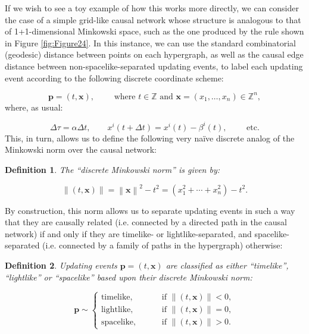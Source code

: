 \documentclass{article}
\newtheorem{definition}{Definition}
\begin{document}
If we wish to see a toy example of how this works more directly, we can consider the case of a simple grid-like causal network whose structure is analogous to that of 1+1-dimensional Minkowski space, such as the one produced by the rule shown in Figure \ref{fig:Figure24}. In this instance, we can use the standard combinatorial (geodesic) distance between points on each hypergraph, as well as the causal edge distance between non-spacelike-separated updating events, to label each updating event according to the following discrete coordinate scheme:

\begin{equation}
\mathbf{p} = \left( t, \mathbf{x} \right), \qquad \text{ where } t \in \mathbb{Z} \text{ and } \mathbf{x} = \left( x_1, \dots, x_n \right) \in \mathbb{Z}^{n},
\end{equation}
where, as usual:

\begin{equation}
\Delta \tau = \alpha \Delta t, \qquad x^{i} \left( t + \Delta t \right) = x^{i} \left( t \right) - \beta^{i} \left( t \right), \qquad \text{ etc.}
\end{equation}
This, in turn, allows us to define the following very na\"ive discrete analog of the Minkowski norm over the causal network:

\begin{definition}
The ``discrete Minkowski norm'' is given by:

\begin{equation}
\left\lVert \left( t, \mathbf{x} \right) \right\rVert = \left\lVert \mathbf{x} \right\rVert^2 - t^2 = \left( x_{1}^{2} + \cdots + x_{n}^{2} \right) - t^2.
\end{equation}
\end{definition}
By construction, this norm allows us to separate updating events in such a way that they are causally related (i.e. connected by a directed path in the causal network) if and only if they are timelike- or lightlike-separated, and spacelike-separated (i.e. connected by a family of paths in the hypergraph) otherwise:

\begin{definition}
Updating events ${\mathbf{p} = \left( t, \mathbf{x} \right)}$ are classified as either ``timelike'', ``lightlike'' or ``spacelike'' based upon their discrete Minkowski norm:

\begin{equation}
\mathbf{p} \sim \begin{cases}
\text{timelike}, \qquad &\text{ if } \left\lVert \left( t, \mathbf{x} \right) \right\rVert < 0,\\
\text{lightlike}, \qquad &\text{ if } \left\lVert \left( t, \mathbf{x} \right) \right\rVert = 0,\\
\text{spacelike}, \qquad &\text{ if } \left\lVert \left( t, \mathbf{x} \right) \right\rVert > 0.
\end{cases}
\end{equation}
\end{definition}
\end{document}

